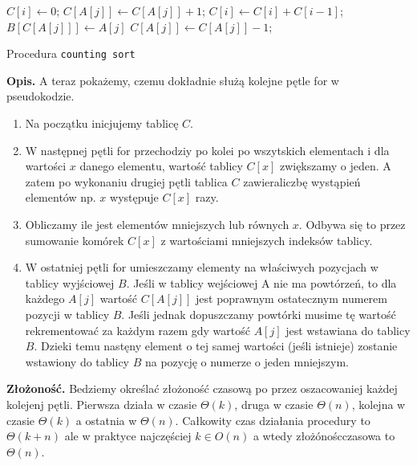 \begin{algorithm}[h]

  \DontPrintSemicolon
  
  

  
     {
    $C[i] \leftarrow 0$;
  }
      {
    $C[A[j]] \leftarrow C[A[j]]+1$;
  }
      {
    $C[i] \leftarrow C[i]+C[i-1]$;
  }
      {
    $B[C[A[j]]] \leftarrow A[j]$\;
    $C[A[j]] \leftarrow C[A[j]]-1$;
  }
  
  \caption{Procedura \texttt{counting sort}}
  \label{alg-count}
\end{algorithm}
\textbf{Opis.}
A teraz pokażemy, czemu dokładnie służą kolejne pętle for w pseudokodzie.
\begin{enumerate}
\item Na początku inicjujemy tablicę $C$.
\item W następnej pętli for przechodziy po kolei po wszytskich elementach i dla wartości $x$ danego elementu, wartość tablicy $C[x]$ zwiększamy o jeden. A zatem po wykonaniu drugiej pętli tablica $C$ zawieraliczbę wystąpień elementów np. $x$ występuje $C[x]$ razy.
\item Obliczamy ile jest elementów mniejszych lub równych $x$. Odbywa się to przez sumowanie komórek $C[x]$ z wartościami mniejszych indeksów tablicy.
\item W ostatniej pętli for umieszczamy elementy na właściwych pozycjach w tablicy wyjściowej $B$. Jeśli w tablicy wejściowej A nie ma powtórzeń, to dla każdego $A[j]$ wartość $C[A[j]]$ jest poprawnym ostatecznym numerem pozycji w tablicy $B$. Jeśli jednak dopuszczamy powtórki musime tę wartość rekrementować za każdym razem gdy wartość $A[j]$ jest wstawiana do tablicy $B$. Dzieki temu nastęny element o tej samej wartości (jeśli istnieje) zostanie wstawiony do tablicy $B$ na pozycję o numerze o jeden mniejszym.
\end{enumerate}

\textbf{Złożoność.} 
Bedziemy określać złożoność czasową po przez oszacowaniej każdej kolejenj pętli.
Pierwsza działa w czasie $\Theta(k)$, druga w czasie $\Theta(n)$, kolejna w czasie $\Theta(k)$ a ostatnia w $\Theta(n)$.
Całkowity czas działania procedury to $\Theta(k+n)$ ale w praktyce najczęściej $k \in O(n)$ a wtedy złożónoścczasowa to \textbf{$\Theta(n)$}.

